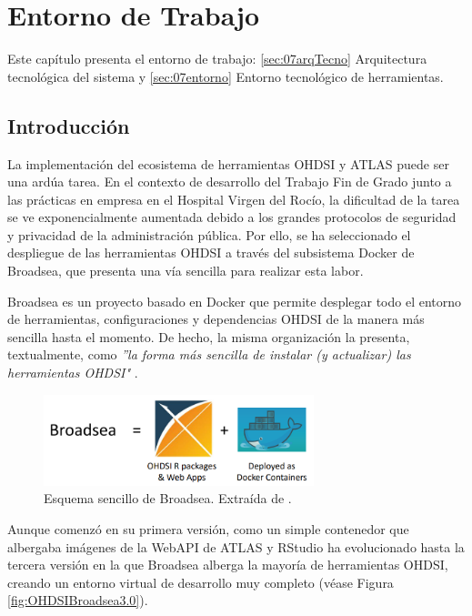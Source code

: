 \chapter{Entorno de Trabajo}\label{cap:07diseño}

Este capítulo presenta el entorno de trabajo: \ref{sec:07arqTecno} Arquitectura tecnológica del sistema y \ref{sec:07entorno} Entorno tecnológico de herramientas.

\section{Introducción}

La implementación del ecosistema de herramientas OHDSI y ATLAS puede ser una ardúa tarea. En el contexto de desarrollo del Trabajo Fin de Grado junto a las prácticas en empresa en el Hospital Virgen del Rocío, la dificultad de la tarea se ve exponencialmente aumentada debido a los grandes protocolos de seguridad y privacidad de la administración pública. Por ello, se ha seleccionado el despliegue de las herramientas OHDSI a través del subsistema Docker de Broadsea, que presenta una vía sencilla para realizar esta labor. 

Broadsea es un proyecto basado en Docker que permite desplegar todo el entorno de herramientas, configuraciones y dependencias OHDSI de la manera más sencilla hasta el momento. De hecho, la misma organización la presenta, textualmente, como \textit{''la forma más sencilla de instalar (y actualizar) las herramientas OHDSI"} \cite{Broadsea3PDF}. 

\begin{figure}[H]
    \centering
    \includegraphics[width=0.70\textwidth]{figures/broadseaEq.png}
    \caption{Esquema sencillo de Broadsea. Extraída de \cite{Broadsea3PPTX}.}
    \label{fig:broadseaEq}
\end{figure}

Aunque comenzó en su primera versión, como un simple contenedor que albergaba imágenes de la WebAPI de ATLAS y RStudio \cite{Broadsea3PPTX} ha evolucionado hasta la tercera versión en la que Broadsea alberga la mayoría de herramientas OHDSI, creando un entorno virtual de desarrollo muy completo (véase Figura \ref{fig:OHDSIBroadsea3.0}). 

